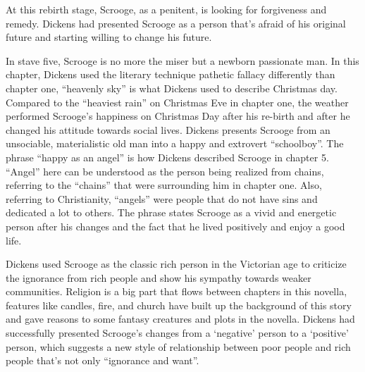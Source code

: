\documentclass[11pt, oneside]{article}   	%
\begin{document}
At this rebirth stage, Scrooge, as a penitent, is looking for forgiveness and remedy. Dickens had presented Scrooge as a person that’s afraid of his original future and starting willing to change his future. 


In stave five, Scrooge is no more the miser but a newborn passionate man. In this chapter, Dickens used the literary technique pathetic fallacy differently than chapter one, “heavenly sky” is what Dickens used to describe Christmas day. Compared to the “heaviest rain” on Christmas Eve in chapter one, the weather performed Scrooge’s happiness on Christmas Day after his re-birth and after he changed his attitude towards social lives. Dickens presents Scrooge from an unsociable, materialistic old man into a happy and extrovert “schoolboy”. The phrase “happy as an angel” is how Dickens described Scrooge in chapter 5. “Angel” here can be understood as the person being realized from chains, referring to the “chains” that were surrounding him in chapter one. Also, referring to Christianity, “angels” were people that do not have sins and dedicated a lot to others. The phrase states Scrooge as a vivid and energetic person after his changes and the fact that he lived positively and enjoy a good life. 


Dickens used Scrooge as the classic rich person in the Victorian age to criticize the ignorance from rich people and show his sympathy towards weaker communities. Religion is a big part that flows between chapters in this novella, features like candles, fire, and church have built up the background of this story and gave reasons to some fantasy creatures and plots in the novella. Dickens had successfully presented Scrooge’s changes from a ‘negative’ person to a ‘positive’ person, which suggests a new style of relationship between poor people and rich people that’s not only “ignorance and want”. 
\end{document}
